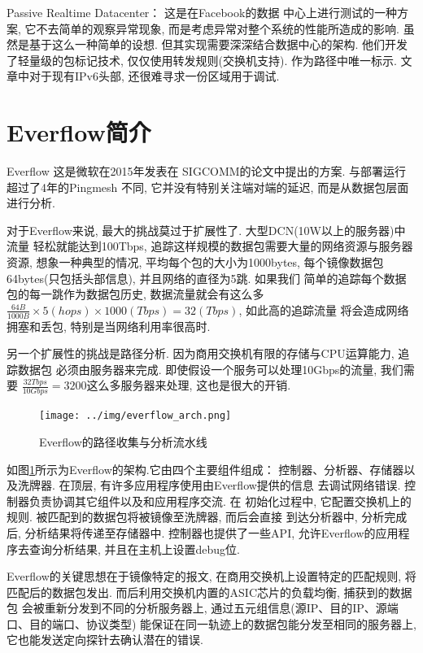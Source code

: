 Passive Realtime Datacenter：\cite{roy2017passive} 这是在Facebook的数据
中心上进行测试的一种方案, 它不去简单的观察异常现象,
而是考虑异常对整个系统的性能所造成的影响. 虽然是基于这么一种简单的设想.
但其实现需要深深结合数据中心的架构. 他们开发了轻量级的包标记技术,
仅仅使用转发规则(交换机支持). 作为路径中唯一标示. 文章中对于现有IPv6头部, 
还很难寻求一份区域用于调试.


\section{Everflow简介}

  Everflow \cite{greenberg2016packet} 这是微软在2015年发表在
SIGCOMM的论文中提出的方案. 与部署运行超过了4年的Pingmesh\cite{guo2015pingmesh}
不同, 它并没有特别关注端对端的延迟, 而是从数据包层面进行分析.

  对于Everflow来说, 最大的挑战莫过于扩展性了. 大型DCN(10W以上的服务器)中流量
轻松就能达到100Tbps, 追踪这样规模的数据包需要大量的网络资源与服务器资源,
想象一种典型的情况, 平均每个包的大小为1000bytes,
每个镜像数据包64bytes(只包括头部信息), 并且网络的直径为5跳. 如果我们
简单的追踪每个数据包的每一跳作为数据包历史, 数据流量就会有这么多
$\frac{64B}{1000B} \times 5(hops) \times 1000(Tbps) = 32(Tbps)$, 如此高的追踪流量
将会造成网络拥塞和丢包, 特别是当网络利用率很高时.

  另一个扩展性的挑战是路径分析. 因为商用交换机有限的存储与CPU运算能力, 追踪数据包
必须由服务器来完成. 即使假设一个服务可以处理10Gbps的流量, 我们需要
$\frac{32Tbps}{10Gbps} = 3200$这么多服务器来处理, 这也是很大的开销.


\begin{figure}
  \centering
  \texttt{[image: ../img/everflow\_arch.png]}
  \caption{Everflow的路径收集与分析流水线}
  \label{fig:everflow_arch}
\end{figure}

  如图\ref{fig:everflow_arch}所示为Everflow的架构.它由四个主要组件组成：
控制器、分析器、存储器以及洗牌器. 在顶层, 有许多应用程序使用由Everflow提供的信息
去调试网络错误. 控制器负责协调其它组件以及和应用程序交流. 在
初始化过程中, 它配置交换机上的规则. 被匹配到的数据包将被镜像至洗牌器, 而后会直接
到达分析器中, 分析完成后, 分析结果将传递至存储器中.
控制器也提供了一些API, 允许Everflow的应用程序去查询分析结果, 并且在主机上设置debug位.

  Everflow的关键思想在于镜像特定的报文, 在商用交换机上设置特定的匹配规则, 将匹配后的数据包发出.
而后利用交换机内置的ASIC芯片的负载均衡, 捕获到的数据包
会被重新分发到不同的分析服务器上, 通过五元组信息(源IP、目的IP、源端口、目的端口、协议类型)
能保证在同一轨迹上的数据包能分发至相同的服务器上,
它也能发送定向探针去确认潜在的错误.

